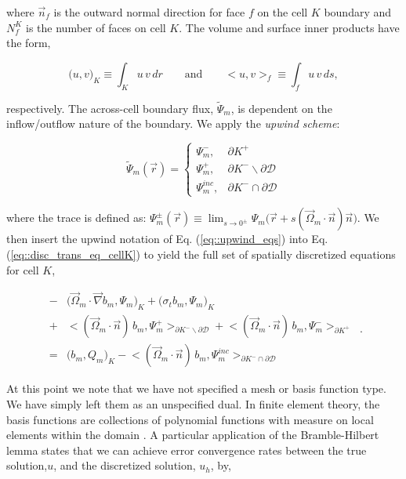 \documentclass[11pt]{article}
\begin{document}
\noindent where $\vec{n}_f$ is the outward normal direction for face $f$ on the cell $K$ boundary and $N_f^K$ is the number of faces on cell $K$. The volume and surface inner products have the form,

\begin{equation}
\label{eq::inner_prod}
\Big( u,v \Big)_K \equiv \int_K u \, v \, d r \qquad \text{and} \qquad \Big< u,v \Big>_f \equiv \int_f u \, v \, d s ,
\end{equation}

\noindent respectively. The across-cell boundary flux, $\tilde{\Psi}_m$, is dependent on the inflow/outflow nature of the boundary. We apply the {\em upwind scheme}:

\begin{equation}
\label{eq::upwind_eqs}
\tilde{\Psi}_m (\vec{r})  = 
\begin{cases}
\Psi_m^{-} , & \partial K^+ \\
\Psi_m^{+}, & \partial K^- \backslash \partial \mathcal{D} \\
\Psi_m^{inc}, & \partial K^- \cap \partial \mathcal{D}
\end{cases}
\end{equation}

\noindent where the trace is defined as: $\Psi_m^{\pm} (\vec{r}) \equiv \lim_{s \rightarrow 0^{\pm}} \Psi_m \Big( \vec{r} + s (\vec{\Omega}_m \cdot \vec{n}) \vec{n} \Big)$. We then insert the upwind notation of Eq. (\ref{eq::upwind_eqs}) into Eq. (\ref{eq::disc_trans_eq_cellK}) to yield the full set of spatially discretized equations for cell $K$,

\begin{equation}
\label{eq::full_cellK_disc}
\begin{aligned}
-  &\Big( \vec{\Omega}_m \cdot   \vec{\nabla} b_m, \Psi_{m} \Big)_{K}   + \Big(  \sigma_{t} b_m ,   \Psi_{m} \Big)_{K}  \\
  + & \Big< ( \vec{\Omega}_m \cdot \vec{n} ) \, b_m, {\Psi}_m^{+}  \Big>_{\partial K^- \backslash \partial \mathcal{D}}  +  \Big< ( \vec{\Omega}_m \cdot \vec{n} ) \, b_m, {\Psi}_m^{-}  \Big>_{\partial K^+}  \\
= & \Big(  b_m ,   Q_m \Big)_{K} - \Big< ( \vec{\Omega}_m \cdot \vec{n} ) \, b_m, {\Psi}_m^{inc}  \Big>_{\partial K^- \cap \partial \mathcal{D}} 
\end{aligned} \, .
\end{equation}

At this point we note that we have not specified a mesh or basis function type. We have simply left them as an unspecified dual. In finite element theory, the basis functions are collections of polynomial functions with measure on local elements within the domain \cite{ern2013theory}. A particular application of the Bramble-Hilbert lemma states that we can achieve error convergence rates between the true solution,$u$, and the discretized solution, $u_h$, by,
\end{document}
